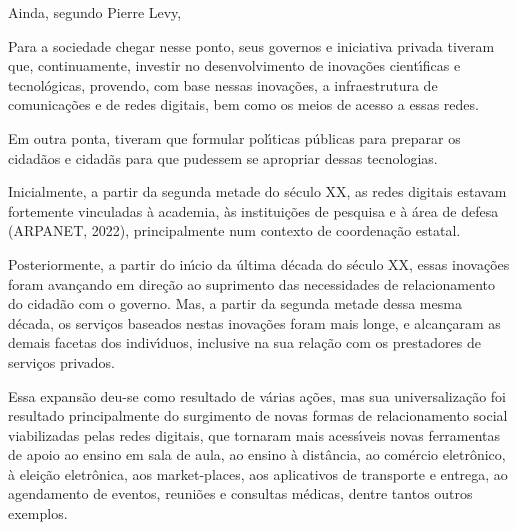 \documentclass[
12pt,		%
openright,	%
twoside,  %
a4paper,			%
chapter=TITLE,		%
english,			%
french,				%
spanish,			%
brazil				%
]{USPSC-classe/USPSC}
\begin{document}
Ainda, segundo Pierre Levy,





\noindent\begin{center}\mbox{\centering{}}\end{center}


Para a sociedade chegar nesse ponto, seus governos e iniciativa privada tiveram que, continuamente, investir no desenvolvimento de inova\c{c}\~oes cient\'{\i}ficas e tecnol\'ogicas,  provendo, com base nessas inova\c{c}\~oes, a infraestrutura de comunica\c{c}\~oes e de redes digitais, bem como os meios de acesso a essas redes.




Em outra ponta, tiveram que formular pol\'{\i}ticas p\'ublicas para preparar os cidad\~aos e cidad\~as para que pudessem se apropriar dessas tecnologias.




Inicialmente, a partir da segunda metade do s\'eculo XX, as redes digitais estavam fortemente vinculadas \`a academia, \`as institui\c{c}\~oes de pesquisa e \`a \'area de defesa  (ARPANET, 2022), principalmente num contexto de coordena\c{c}\~ao estatal.




Posteriormente, a partir do in\'{\i}cio da \'ultima d\'ecada do s\'eculo XX, essas inova\c{c}\~oes  foram avan\c{c}ando em dire\c{c}\~ao ao suprimento das necessidades de relacionamento do cidad\~ao com o governo. Mas, a partir da segunda metade dessa mesma d\'ecada, os servi\c{c}os baseados nestas inova\c{c}\~oes foram mais longe, e alcan\c{c}aram  as demais facetas dos indiv\'{\i}duos, inclusive na sua rela\c{c}\~ao com os prestadores de servi\c{c}os privados.




Essa expans\~ao deu-se como resultado de v\'arias a\c{c}\~oes, mas sua universaliza\c{c}\~ao foi resultado principalmente do surgimento de novas formas de relacionamento social viabilizadas pelas redes digitais, que tornaram mais acess\'{\i}veis novas ferramentas de apoio ao ensino em sala de aula, ao ensino \`a dist\^ancia, ao com\'ercio eletr\^onico, \`a elei\c{c}\~ao eletr\^onica, aos \textquotedbl market-places\textquotedbl , aos aplicativos de transporte e entrega, ao agendamento de eventos, reuni\~oes e consultas m\'edicas, dentre tantos outros exemplos.
\end{document}
